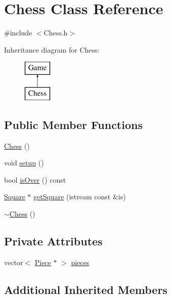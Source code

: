 \hypertarget{classChess}{}\section{Chess Class Reference}
\label{classChess}


{\ttfamily \#include $<$Chess.\+h$>$}

Inheritance diagram for Chess\+:\begin{figure}[H]
\begin{center}
\leavevmode
\includegraphics[height=2.000000cm]{classChess}
\end{center}
\end{figure}
\subsection*{Public Member Functions}
\begin{DoxyCompactItemize}
\item 
\hyperlink{classChess_a8b493f742d0ceced6f853fa30d3c05a8}{Chess} ()
\item 
void \hyperlink{classChess_a9722d5c13c442eae33ca17792996213a}{setup} ()
\item 
bool \hyperlink{classChess_a62b09f4b86c385c8042b8c7e192e10e5}{is\+Over} () const 
\item 
\hyperlink{classSquare}{Square} $\ast$ \hyperlink{classChess_a48b59dcf880ff97114b8c5a3989b0364}{get\+Square} (istream const \&is)
\item 
\hyperlink{classChess_aa9717ab5263bc4fbb844e78bbe5587a8}{$\sim$\+Chess} ()
\end{DoxyCompactItemize}
\subsection*{Private Attributes}
\begin{DoxyCompactItemize}
\item 
vector$<$ \hyperlink{classPiece}{Piece} $\ast$ $>$ \hyperlink{classChess_af1095b2af2920e5d12cf133dd88cf30e}{pieces}
\end{DoxyCompactItemize}
\subsection*{Additional Inherited Members}


